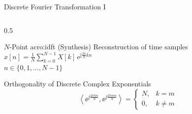 \begin{frame}{Discrete Fourier Transformation I}
\begin{columns}[T,onlytextwidth]
\begin{column}{0.5\textwidth}
      \begin{block}{$N$-Point \gls{acro:idft} (Synthesis)}
        Reconstruction of time samples\\
        \vspace{0.4em}
        \centering
        $x[n] = \frac{1}{N}\sum_{k=0}^{N-1} X[k] \,\mathrm{e}^{\mathrm{j} \frac{2\pi}{N} k n}$ \\[0.2cm]
        \footnotesize $n \in \{0, 1, \dots, N-1\}$
      \end{block}
      \begin{block}{Orthogonality of Discrete Complex Exponentials}
        $$\left\langle \ee^{\jj \frac{2 \pi k n}{N}}, \ee^{\jj \frac{2 \pi m n}{N}} \right\rangle= \begin{cases} N, & k = m \\ 0, & k \neq m \end{cases}$$
      \end{block}
    \end{column}
  \end{columns}
\end{frame}

